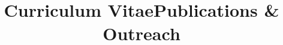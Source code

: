 \documentclass[10pt,a4paper]{moderncv}
\title{Curriculum Vitae}
\begin{document}


%
%
%



\makecvtitle %









% 


%
%

\clearpage
\title{Publications \& Outreach}
\maketitle



%
%
%

\end{document}
